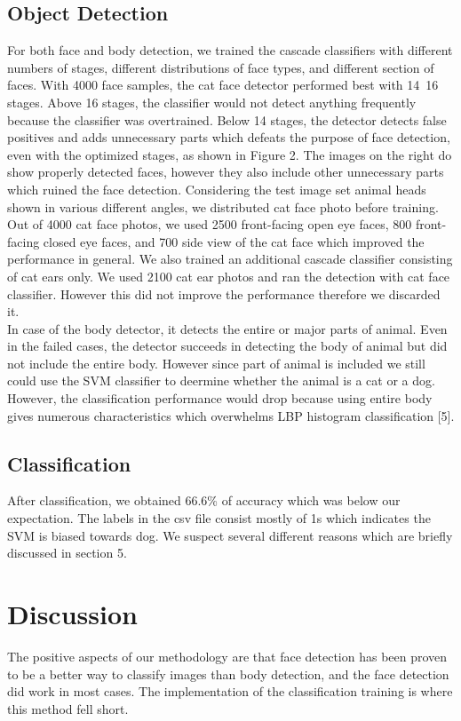 \documentclass[conference,compsoc]{IEEEtran}
\begin{document}
\subsection{Object Detection}
For both face and body detection, we trained the cascade classifiers with different numbers of stages, different distributions of face types, and different section of faces. With 4000 face samples, the cat face detector performed best with 14~16 stages. Above 16 stages, the classifier would not detect anything frequently because the classifier was overtrained. Below 14 stages, the detector detects false positives and adds unnecessary parts which defeats the purpose of face detection, even with the optimized stages, as shown in Figure 2. The images on the right do show properly detected faces, however they also include other unnecessary parts which ruined the face detection. Considering the test image set animal heads shown in various different angles, we distributed cat face photo before training. Out of 4000 cat face photos, we used 2500 front-facing open eye faces, 800 front-facing closed eye faces, and 700 side view of the cat face which improved the performance in general. We also trained an additional cascade classifier consisting of cat ears only. We used 2100 cat ear photos and ran the detection with cat face classifier. However this did not improve the performance therefore we discarded it.\\

In case of the body detector, it detects the entire or major parts of animal. Even in the failed cases, the detector succeeds in detecting the body of animal but did not include the entire body. However since part of animal is included we still could use the SVM classifier to deermine whether the animal is a cat or a dog. However, the classification performance would drop because using entire body gives numerous characteristics which overwhelms LBP histogram classification [5].
\subsection{Classification}
After classification, we obtained 66.6\% of accuracy which was below our expectation. The labels in the csv file consist  mostly of 1s which indicates the SVM is biased towards dog. We suspect several different reasons which are briefly discussed in section 5.

\section{Discussion}
The positive aspects of our methodology are that face detection has been proven to be a better way to classify images than body detection, and the face detection did work in most cases. The implementation of the classification training is where this method fell short. \\
\end{document}
